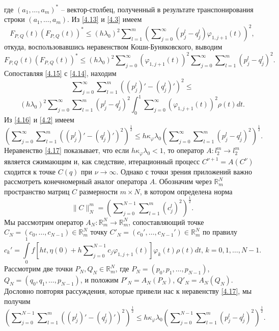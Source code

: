 где $(a_1,\ldots,a_m)^*$ -- вектор-столбец, полученный в результате транспонирования строки $(a_1,\ldots,a_m)$.
Из \eqref{4.13} и \eqref{4.3}  имеем
$$
F_{P,Q}(t)(F_{P,Q}(t))^*\le (h\lambda_0)^2 \sum\nolimits_{l=1}^m  \left(\sum\nolimits_{j=0}^\infty( p^l_j-q^l_j)\varphi_{1,j+1}(t)\right)^2,
$$
откуда,  воспользовавшись неравенством Коши-Буняковского, выводим
\begin{equation}\label{4.15}
F_{P,Q}(t)(F_{P,Q}(t))^*\le(h\lambda_0)^2  \sum\nolimits_{j=0}^\infty(\varphi_{1,j+1}(t))^2 \sum\nolimits_{j=0}^\infty\sum\nolimits_{l=1}^m( p^l_j-q^l_j)^2.
\end{equation}
Сопоставляя \eqref{4.15} с \eqref{4.14}, находим
$$
\sum\nolimits_{j=0}^\infty\sum\nolimits_{l=1}^m((p^l_j)'-(q^l_j)')^2\le
$$
\begin{equation}\label{4.16}
(h\lambda_0)^2 \sum\nolimits_{j=0}^\infty\sum\nolimits_{l=1}^m( p^l_j-q^l_j)^2\int_{0}^1 \sum\nolimits_{j=0}^\infty(\varphi_{1,j+1}(t))^2\rho(t) dt.
\end{equation}
Из  \eqref{4.16}  и \eqref{4.2} имеем
\begin{equation}\label{4.17}
\left(\sum\nolimits_{j=0}^\infty\sum\nolimits_{l=1}^m((p^l_j)'-(q^l_j)')^2\right)^\frac12\le h\kappa_\varphi\lambda_0 \left(\sum\nolimits_{j=0}^\infty\sum\nolimits_{l=1}^m( p^l_j-q^l_j)^2\right)^\frac12.
\end{equation}
Неравенство \eqref{4.17} показывает, что если $h\kappa_\varphi\lambda_0<1$, то оператор  $A:l_2^m\to l_2^m$ является сжимающим и, как следствие, итерационный процесс $C^{\nu+1}=A(C^{\nu})$  сходится к точке $C(q)$ при $\nu\to\infty$. Однако с точки зрения приложений важно рассмотреть конечномерный аналог оператора $A$. Обозначим через $\mathbb{R}^N_m$ пространство матриц $C$ размерности $m\times N$, в котором определена норма
$$\|C\|_N^m=\left(\sum\nolimits_{j=0}^{N-1} \sum\nolimits_{l=1}^{m}(c_j^l)^2\right)^\frac12.$$
Мы рассмотрим оператор $A_N:\mathbb{R}^N_m\to \mathbb{R}^N_m$, сопоставляющий точке
$C_N=(c_0,\ldots,c_{N-1})\in \mathbb{R}^N_m $ точку  $C'_N=(c_0',\ldots,c_{N-1}')\in \mathbb{R}^N_m $ по правилу
\begin{equation}\label{4.18}
c_k'=\int\limits_{0}^1f\left[ht,\eta(0)+ h\sum\nolimits_{j=0}^{N-1} c_j\varphi_{1,j+1}(t)\right]\varphi_k(t)\rho(t) dt,\,k=0,1,\ldots, N-1.
\end{equation}
Рассмотрим две точки $P_N,Q_N\in \mathbb{R}^N_m$, где $P_N=(p_0,p_1,\ldots,p_{N-1})$, $Q_N=(q_0,q_1,\ldots,p_{N-1})$, и положим $P'_N=A_N(P_N)$, $Q'_N=A_N(Q_N)$. Дословно повторяя рассуждения, которые привели нас к неравенству \eqref{4.17}, мы получим
\begin{equation}\label{4.19}
\left(\sum\nolimits_{j=0}^{N-1}\sum\nolimits_{l=1}^m((p^l_j)'-(q^l_j)')^2\right)^\frac12\le h\kappa_\varphi\lambda_0 \left(\sum\nolimits_{j=0}^{N-1}\sum\nolimits_{l=1}^m( p^l_j-q^l_j)^2\right)^\frac12.
\end{equation}

